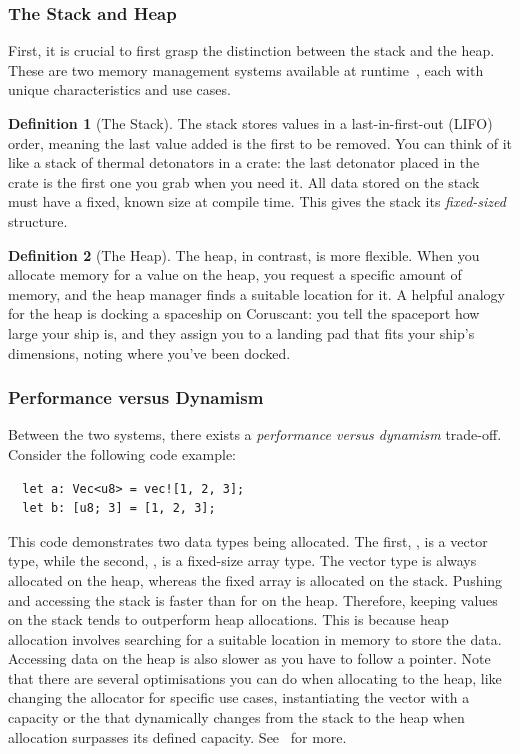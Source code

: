 \documentclass[twoside,11pt]{report}
\theoremstyle{definition}
\newtheorem{definition}{Definition}[section]
\theoremstyle{plain}
\begin{document}
\subsubsection{The Stack and Heap}
First, it is crucial to first grasp the distinction between the stack and the heap. These are two memory management systems available at runtime~\cite[ch.4]{rustlangRustProgramming}, each with unique characteristics and use cases.

\begin{definition}[The Stack]
  The stack stores values in a last-in-first-out (LIFO) order, meaning the last value added is the first to be removed. You can think of it like a stack of thermal detonators in a crate: the last detonator placed in the crate is the first one you grab when you need it. All data stored on the stack must have a fixed, known size at compile time. This gives the stack its \textit{fixed-sized} structure.
\end{definition}

\begin{definition}[The Heap]
  The heap, in contrast, is more flexible. When you allocate memory for a value on the heap, you request a specific amount of memory, and the heap manager finds a suitable location for it. A helpful analogy for the heap is docking a spaceship on Coruscant: you tell the spaceport how large your ship is, and they assign you to a landing pad that fits your ship's dimensions, noting where you've been docked.
\end{definition}

\subsubsection*{Performance versus Dynamism}

Between the two systems, there exists a \textit{performance versus dynamism} trade-off. Consider the following code example:

\begin{verbatim}
  let a: Vec<u8> = vec![1, 2, 3];
  let b: [u8; 3] = [1, 2, 3];
\end{verbatim}

This code demonstrates two data types being allocated. The first, , is a vector type, while the second, , is a fixed-size array type. The vector type is always allocated on the heap, whereas the fixed array is allocated on the stack. Pushing  and accessing the stack is faster than for on the heap. Therefore, keeping values on the stack tends to outperform heap allocations. This is because heap allocation involves searching for a suitable location in memory to store the data. Accessing data on the heap is also slower as you have to follow a pointer. Note that there are several optimisations you can do when allocating to the heap, like changing the allocator for specific use cases, instantiating the vector with a capacity or the  that dynamically changes from the stack to the heap when allocation surpasses its defined capacity. See~\cite{rustlangPerformanceBook} for more.
\end{document}

